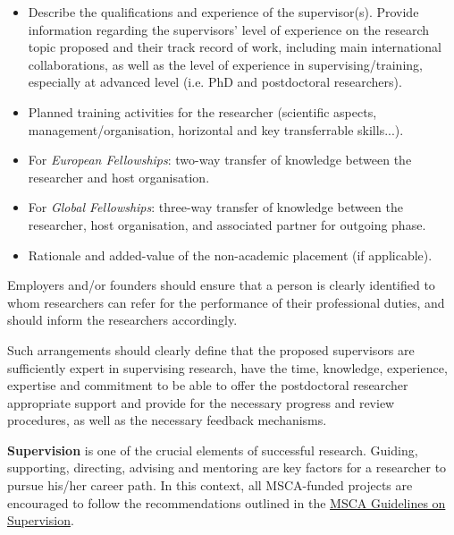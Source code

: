 \documentclass[11pt,draftproposal]{msca-pf}
\begin{document}
\begin{itemize}
    \item Describe the qualifications and experience of the supervisor(s).
    Provide information regarding the supervisors' level of experience on the
    research topic proposed and their track record of work, including main
    international collaborations, as well as the level of experience in
    supervising/training, especially at advanced level (i.e. PhD and postdoctoral
    researchers).

    \item Planned training activities for the researcher (scientific aspects,
    management/organisation, horizontal and key transferrable skills...).

    \item For \emph{European Fellowships}: two-way transfer of knowledge between
    the researcher and host organisation.

    \item For \emph{Global Fellowships}: three-way transfer of knowledge between
    the researcher, host organisation, and associated partner for outgoing phase.

    \item Rationale and added-value of the non-academic placement (if applicable).
\end{itemize}

Employers and/or founders should ensure that a person is clearly identified to
whom researchers can refer for the performance of their professional duties, and
should inform the researchers accordingly.

Such arrangements should clearly define that the proposed supervisors are
sufficiently expert in supervising research, have the time, knowledge, experience,
expertise and commitment to be able to offer the postdoctoral researcher
appropriate support and provide for the necessary progress and review procedures,
as well as the necessary feedback mechanisms.

\textbf{Supervision} is one of the crucial elements of successful research. Guiding,
supporting, directing, advising and mentoring are key factors for a researcher
to pursue his/her career path. In this context, all MSCA-funded projects are
encouraged to follow the recommendations outlined in the
\href{https://data.europa.eu/doi/10.2766/508311}{MSCA Guidelines on Supervision}\footnotemark{}.

\end{document}
